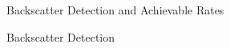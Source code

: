 \documentclass[journal]{IEEEtran}
\newtheorem{remark}{Remark}
\begin{document}
\begin{section}{Backscatter Detection and Achievable Rates}
\begin{subsection}{Backscatter Detection}




\end{subsection}
\end{section}
\end{document}

